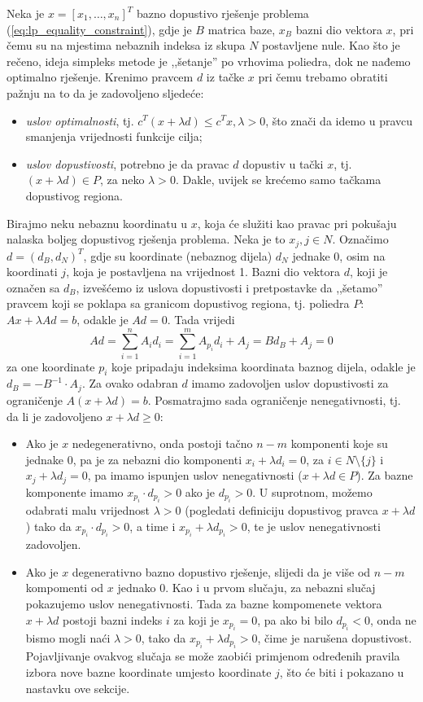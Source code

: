 \documentclass[a4paper, utf8, 11pt, colorlinks]{book}
\theoremstyle{definition}
\begin{document}
 Neka je $x = [x_1,\ldots, x_n]^T$ bazno dopustivo rješenje problema (\ref{eq:lp_equality_constraint}), gdje je $B$ matrica baze, $x_B$ bazni dio vektora $x$, pri čemu su na mjestima nebaznih indeksa iz skupa $N$ postavljene nule.  Kao što je rečeno, ideja simpleks metode je  ,,šetanje'' po vrhovima poliedra,  dok ne nađemo optimalno rješenje. Krenimo pravcem $d$  iz tačke $x$  pri čemu trebamo obratiti  pažnju na to da je zadovoljeno sljedeće:
\begin{itemize}
    \item \emph{uslov optimalnosti}, tj. $c^T (x + \lambda d) \leq c^T x, \lambda>0$, što znači da idemo u pravcu smanjenja vrijednosti funkcije cilja;
    \item \emph{uslov dopustivosti}, potrebno je da pravac $d$ dopustiv u tački $x$, tj. $ (x + \lambda d) \in P$, za neko $\lambda>0$. Dakle, uvijek se krećemo samo tačkama dopustivog regiona. 
\end{itemize}
Birajmo neku nebaznu koordinatu u $x$, koja će služiti kao pravac pri pokušaju nalaska boljeg dopustivog rješenja problema. 
 Neka je to $x_j, j \in N$. Označimo $d=(d_B,  d_N)^T$, gdje su koordinate    (nebaznog dijela) $d_N$ jednake 0, osim na koordinati $j$, koja je postavljena na vrijednost 1.   Bazni dio vektora $d$, koji je označen sa $d_B$, izvešćemo iz uslova dopustivosti i pretpostavke da ,,šetamo'' pravcem koji se poklapa sa granicom dopustivog regiona, tj. poliedra $P$: $Ax + \lambda Ad = b$, odakle je $Ad = 0$. Tada vrijedi
$$ Ad = \sum_{i=1}^n A_i d_i = \sum_{i=1}^m A_{p_i} d_i + A_j = B d_B + A_j = 0$$ za one koordinate $p_i$ koje pripadaju indeksima koordinata baznog dijela, 
odakle je $d_B = -  B^{-1} \cdot A_j $.  Za ovako odabran $d$ imamo zadovoljen uslov dopustivosti za ograničenje $A( x + \lambda d )  =b$. Posmatrajmo sada ograničenje nenegativnosti, tj. da li je zadovoljeno $x + \lambda d \geq 0$:
\begin{itemize}
    \item Ako je $x$ nedegenerativno, onda postoji tačno $n-m$ komponenti koje su jednake 0, pa je za nebazni dio komponenti $x_i + \lambda d_i = 0$, za $i \in N \setminus \{j\}$ i $x_j + \lambda d_j = 0$, pa imamo ispunjen uslov nenegativnosti ($x + \lambda d\in P$). Za bazne komponente imamo $x_{p_i} \cdot d_{p_i} > 0 $ ako je $d_{p_i}>0$. U suprotnom, možemo odabrati  malu vrijednost  $\lambda>0$ (pogledati definiciju dopustivog pravca $x +\lambda d$) tako da $x_{p_i} \cdot d_{p_i} >0$, a time i $x_{p_i} + \lambda d_{p_i}>0$, te je uslov nenegativnosti zadovoljen.
 
    \item Ako je $x$ degenerativno bazno dopustivo rješenje, slijedi da je više od $n-m$ kompomenti od $x$ jednako 0. Kao i u prvom slučaju, za nebazni slučaj pokazujemo uslov nenegativnosti. Tada za bazne kompomenete vektora $x +\lambda d$  postoji bazni indeks $i$ za koji je $x_{p_i} = 0$, pa ako bi bilo $d_{p_i}< 0$, onda ne bismo mogli naći $\lambda>0$, tako da $x_{p_i} + \lambda d_{p_i} >0$, čime je narušena dopustivost. Pojavljivanje ovakvog slučaja se može zaobići primjenom određenih pravila izbora nove bazne koordinate umjesto koordinate $j$, što će biti i pokazano u nastavku ove sekcije. 
\end{itemize}
\end{document}
